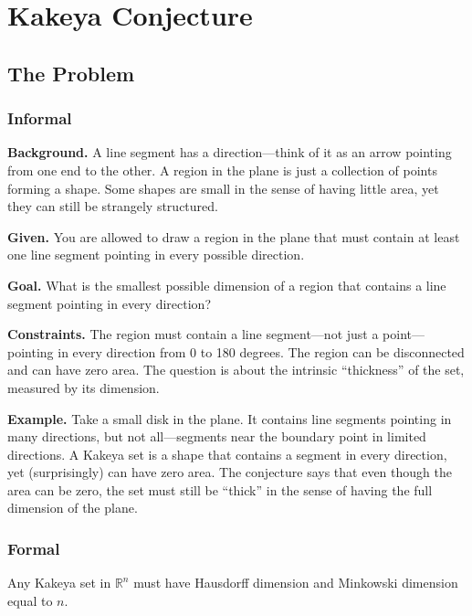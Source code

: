 \let\LocalMacro\relax

\chapter{Kakeya Conjecture}

\section{The Problem}

\subsection{Informal}

\textbf{Background.} A line segment has a direction---think of it as an arrow pointing from one end to the other. A region in the plane is just a collection of points forming a shape. Some shapes are small in the sense of having little area, yet they can still be strangely structured.

\textbf{Given.} You are allowed to draw a region in the plane that must contain at least one line segment pointing in every possible direction.

\textbf{Goal.} What is the smallest possible dimension of a region that contains a line segment pointing in every direction?

\textbf{Constraints.} The region must contain a line segment---not just a point---pointing in every direction from 0 to 180 degrees. The region can be disconnected and can have zero area. The question is about the intrinsic ``thickness'' of the set, measured by its dimension.

\textbf{Example.} Take a small disk in the plane. It contains line segments pointing in many directions, but not all---segments near the boundary point in limited directions. A Kakeya set is a shape that contains a segment in every direction, yet (surprisingly) can have zero area. The conjecture says that even though the area can be zero, the set must still be ``thick'' in the sense of having the full dimension of the plane.

\subsection{Formal}
\begin{conjecture}
Any Kakeya set in $\mathbb{R}^n$ must have Hausdorff dimension and Minkowski dimension equal to $n$.
\end{conjecture}

